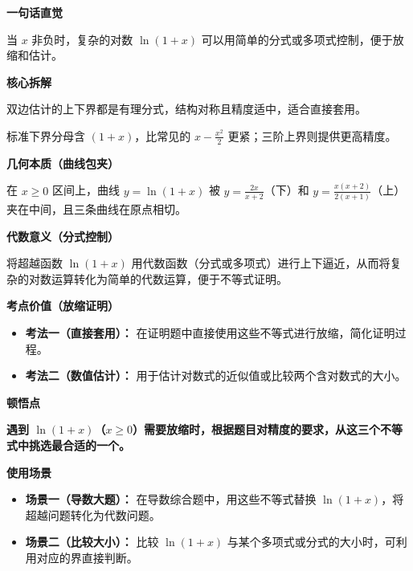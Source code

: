 \begin{explanationbox}
\textbf{\textcolor{CExplanation}{一句话直觉}}

当 $x$ 非负时，复杂的对数 $\ln(1+x)$ 可以用简单的分式或多项式控制，便于放缩和估计。

\medskip
\textbf{\textcolor{CExplanation}{核心拆解}}
\begin{description}[style=nextline, leftmargin=2.8em, labelsep=0.5em, itemsep=0.45em]
    \item[\textbf{要点一（形式稳健）：}] 双边估计的上下界都是有理分式，结构对称且精度适中，适合直接套用。
    \item[\textbf{要点二（精度可调）：}] 标准下界分母含 $(1+x)$，比常见的 $x-\frac{x^2}{2}$ 更紧；三阶上界则提供更高精度。
\end{description}

\medskip
\textbf{\textcolor{CExplanation}{几何本质（曲线包夹）}}

在 $x\geq0$ 区间上，曲线 $y=\ln(1+x)$ 被 $y=\frac{2x}{x+2}$（下）和 $y=\frac{x(x+2)}{2(x+1)}$（上）夹在中间，且三条曲线在原点相切。

\medskip
\textbf{\textcolor{CExplanation}{代数意义（分式控制）}}

将超越函数 $\ln(1+x)$ 用代数函数（分式或多项式）进行上下逼近，从而将复杂的对数运算转化为简单的代数运算，便于不等式证明。

\medskip
\textbf{\textcolor{CExplanation}{考点价值（放缩证明）}}
\begin{itemize}[leftmargin=*, itemsep=0.5em, topsep=0.4em]
    \item \textbf{考法一（直接套用）：} 在证明题中直接使用这些不等式进行放缩，简化证明过程。
    \item \textbf{考法二（数值估计）：} 用于估计对数式的近似值或比较两个含对数式的大小。
\end{itemize}

\medskip
\textbf{\textcolor{CExplanation}{顿悟点}}

\textbf{遇到 $\ln(1+x)$（$x\geq0$）需要放缩时，根据题目对精度的要求，从这三个不等式中挑选最合适的一个。}

\medskip
\textbf{\textcolor{CExplanation}{使用场景}}
\begin{itemize}[leftmargin=*, itemsep=0.5em, topsep=0.4em]
    \item \textbf{场景一（导数大题）：} 在导数综合题中，用这些不等式替换 $\ln(1+x)$，将超越问题转化为代数问题。
    \item \textbf{场景二（比较大小）：} 比较 $\ln(1+x)$ 与某个多项式或分式的大小时，可利用对应的界直接判断。
\end{itemize}
\end{explanationbox}
